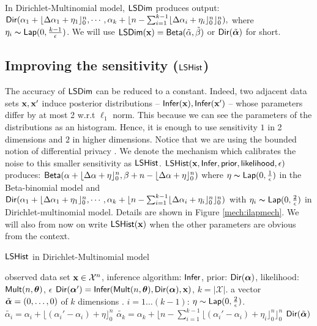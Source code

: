 \documentclass{article}
\begin{document}
  In Dirichlet-Multinomial model, $\mathsf{LSDim}$ produces output:
  $\mathsf{Dir}(\alpha_1 +  \lfloor{\Delta \alpha_1 + \eta_1}\rfloor^n_0, \cdots, \alpha_k + \lfloor n - \sum_{i = 1}^{k-1}\lfloor{\Delta \alpha_i + \eta_i}\rfloor^n_0 \rfloor^n_0),$
  where $\eta_i \thicksim \mathsf{Lap}(0, \frac{k - 1}{\epsilon})$.
  We will use $ \mathsf{LSDim}(\textbf{x}) = \mathsf{Beta}(\tilde{\alpha}, \tilde{\beta})$ or $\mathsf{Dir}(\tilde{\boldsymbol{\alpha}})$ for short.



\subsection{Improving the sensitivity ($\mathsf{LSHist}$)}
 The accuracy of $\mathsf{LSDim}$ can be reduced to a constant.
 Indeed, two adjacent data sets $\textbf{x}, \textbf{x}'$  induce posterior distributions -- $\mathsf{Infer}(\textbf{x}), \mathsf{Infer}(\textbf{x}')$ --
 whose parameters differ by at most 2 w.r.t $\ell_1$ norm. This because we can see the parameters of the distributions as an histogram.
 Hence, it is enough to use sensitivity $1$ in 2 dimensions and $2$ in higher dimensions.
 {\color{red} Notice that we are using the bounded notion of differential privacy \cite{????}.}
 We denote the mechanism which calibrates the noise to this smaller sensitivity as $\mathsf{LSHist}$.
 $\mathsf{LSHist}(\textbf{x},\mathsf{Infer}, \mathsf{prior}, \mathsf{likelihood}, \epsilon)$ produces:
 $\mathsf{Beta}(\alpha +  \lfloor{\Delta \alpha + \eta}\rfloor^n_0,\beta + n - \lfloor{\Delta \alpha + \eta}\rfloor^n_0) $
 where $\eta \thicksim \mathsf{Lap}(0, \frac{1}{\epsilon})$ in the Beta-binomial model and
 $\mathsf{Dir}(\alpha_1 +  \lfloor{\Delta \alpha_1 + \eta_1}\rfloor^n_0, \cdots,  \alpha_k + \lfloor n - \sum_{i = 1}^{k-1}\lfloor{\Delta \alpha_i + \eta_i}\rfloor^n_0 \rfloor^n_0)$
 with $\eta_i \thicksim \mathsf{Lap}(0, \frac{2}{\epsilon})$ in Dirichlet-multinomial model. Details are shown in Figure \ref{mech:ilapmech}. We will also from now on
 write $\mathsf{LSHist}(\textbf{x})$ when the other parameters are obvious from the context.
  \begin{algorithm}
  \caption{$\mathsf{LSHist}$ in Dirichlet-Multinomial model}
  \label{mech:ilapmech}
  \begin{algorithmic}
  \INPUT observed data set $\textbf{x} \in \mathcal{X}^n$, inference algorithm: $\mathsf{Infer}$, 
  prior: $\mathsf{Dir}(\boldsymbol{\alpha})$, likelihood: $\mathsf{Mult}(n, \boldsymbol{\theta})$, $\epsilon$
  \STATE {} $\mathsf{Dir}(\boldsymbol{\alpha}') = \mathsf{Infer}(\mathsf{Mult}(n, \boldsymbol{\theta}), \mathsf{Dir}(\boldsymbol{\alpha}), \textbf{x})$, $k = |\mathcal{X}|$.
  \STATE {} a vector $\tilde{\boldsymbol{\alpha}} = (0, \dots, 0 )$ of $k$ dimensions .
  \STATE {} $i = 1 \dots (k - 1)$:
  \STATE \quad {} $\eta \sim \mathsf{Lap}(0, \frac{2}{\epsilon})$.
  \STATE \quad \quad  $\tilde{\alpha_i}=\alpha_i + \lfloor{(\alpha_i' - \alpha_i) + \eta}\rfloor^n_0$ 
  \STATE \quad $\tilde{\alpha_k} = \alpha_k + \lfloor n - \sum_{i = 1}^{k-1}\lfloor{(\alpha_i' - \alpha_i) + \eta_i}\rfloor^n_0 \rfloor^n_0$
   $\mathsf{Dir}(\tilde{\boldsymbol{\alpha}})$
  \end{algorithmic}
  \end{algorithm}
\end{document}
